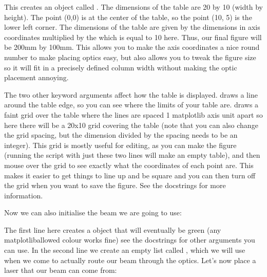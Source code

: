 \documentclass[letterpaper,10pt,english]{sphinxmanual}
\begin{document}
\sphinxAtStartPar
This creates an  object called . The dimensions of the table  are 20 by 10 (width by height). The point (0,0) is at the center of the table, so the point (\sphinxhyphen{}10, \sphinxhyphen{}5) is the lower left corner. The dimensions of the table  are given by the dimensions in axis coordinates multiplied by the  \sphinxhyphen{} which is equal to 10 here. Thus, our final figure will be 200mm by 100mm. This allows you to make the axis coordinates a nice round number to make placing optics easy, but also allows you to tweak the figure size so it will fit in a precisely defined column width without making the optic placement annoying.

\sphinxAtStartPar
The two other keyword arguments affect how the table is displayed.  draws a line around the table edge, so you can see where the limits of your table are.  draws a faint grid over the table where the lines are spaced 1 matplotlib axis unit apart \sphinxhyphen{} so here there will be a 20x10 grid covering the table (note that you can also change the grid spacing, but the dimension divided by the spacing needs to be an integer). This grid is mostly useful for editing, as you can make the figure (running the script with just these two lines will make an empty table), and then mouse over the grid to see exactly what the coordinates of each point are. This makes it easier to get things to line up and be square \sphinxhyphen{} and you can then turn off the grid when you want to save the figure. See the docstrings for more information.

\sphinxAtStartPar
Now we can also initialise the beam we are going to use:

\begin{sphinxVerbatim}[commandchars=\\\{\}]
  
  \PYG{p}{[}\PYG{p}{]}
\end{sphinxVerbatim}

\sphinxAtStartPar
The first line here creates a  object that will eventually be green (any matplotlib\sphinxhyphen{}allowed colour works fine) \sphinxhyphen{} see the docstrings for other arguments you can use. In the second line we create an empty list called , which we will use when we come to actually route our beam through the optics. Let’s now place a laser that our beam can come from:
\end{document}
